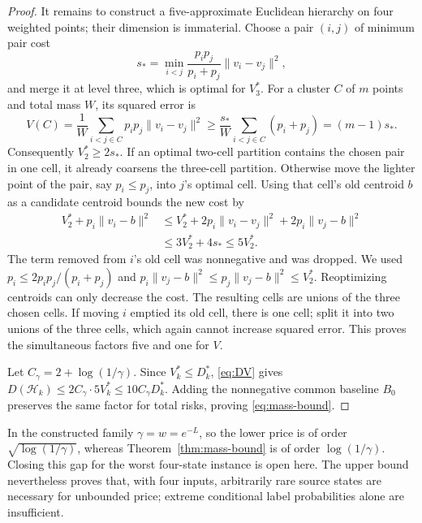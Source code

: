\documentclass[11pt]{article}
\theoremstyle{remark}\newtheorem{remark}[theorem]{Remark}
\newcommand{\cH}{\mathcal H}
\begin{document}
\begin{proof}
It remains to construct a five-approximate Euclidean hierarchy on four
weighted points; their dimension is immaterial. Choose a pair $(i,j)$ of
minimum pair cost
\[
 s_* = \min_{i<j}\frac{p_i p_j}{p_i+p_j}\|v_i-v_j\|^2,
\]
and merge it at level three, which is optimal for $V_3^*$.
For a cluster $C$ of $m$ points and total mass $W$, its squared error is
\[
 V(C)=\frac1W\sum_{i<j\in C}p_i p_j\|v_i-v_j\|^2
 \ge\frac{s_*}{W}\sum_{i<j\in C}(p_i+p_j)=(m-1)s_*.
\]
Consequently $V_2^*\ge2s_*$. If an optimal two-cell partition contains
the chosen pair in one cell, it already coarsens the three-cell partition.
Otherwise move the lighter point of the pair, say $p_i\le p_j$, into
$j$'s optimal cell. Using that cell's old centroid $b$ as a candidate
centroid bounds the new cost by
\begin{align*}
 V_2^*+p_i\|v_i-b\|^2
 &\le V_2^*+2p_i\|v_i-v_j\|^2+2p_i\|v_j-b\|^2\\
 &\le3V_2^*+4s_*\le5V_2^*.
\end{align*}
The term removed from $i$'s old cell was nonnegative and was dropped.
We used $p_i\le2p_ip_j/(p_i+p_j)$ and
$p_i\|v_j-b\|^2\le p_j\|v_j-b\|^2\le V_2^*$.
Reoptimizing centroids can only decrease the cost. The resulting cells are
unions of the three chosen cells. If moving $i$ emptied its old cell,
there is one cell; split it into two unions of the three cells, which
again cannot increase squared error. This proves the simultaneous factors
five and one for $V$.

Let $C_\gamma=2+\log(1/\gamma)$. Since $V_k^*\le D_k^*$,
\eqref{eq:DV} gives
$D(\cH_k)\le2C_\gamma\cdot5V_k^*\le10C_\gamma D_k^*$.
Adding the nonnegative common baseline $B_0$ preserves the same factor
for total risks, proving \eqref{eq:mass-bound}.
\end{proof}

In the constructed family $\gamma=w=e^{-L}$, so the lower price is of
order $\sqrt{\log(1/\gamma)}$, whereas Theorem~\ref{thm:mass-bound}
is of order $\log(1/\gamma)$. Closing this gap for the worst four-state
instance is open here. The upper bound nevertheless proves that, with
four inputs, arbitrarily rare source states are necessary for unbounded
price; extreme conditional label probabilities alone are insufficient.
\end{document}
